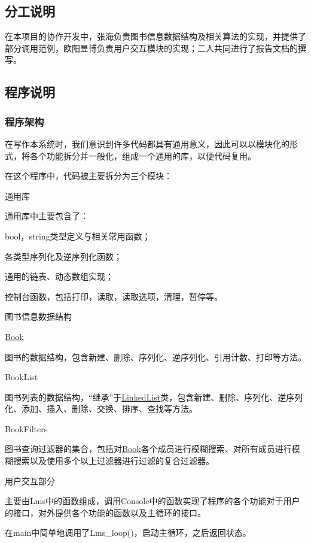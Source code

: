 \subsection*{分工说明}

在本项目的协作开发中，张海负责图书信息数据结构及相关算法的实现，并提供了部分调用范例，欧阳昱博负责用户交互模块的实现；二人共同进行了报告文档的撰写。

\subsection*{程序说明}

\subsubsection*{程序架构}

在写作本系统时，我们意识到许多代码都具有通用意义，因此可以以模块化的形式，将各个功能拆分并一般化，组成一个通用的库，以便代码复用。

在这个程序中，代码被主要拆分为三个模块：


\begin{DoxyEnumerate}
\item 通用库

通用库中主要包含了：
\begin{DoxyItemize}
\item {\ttfamily bool}，{\ttfamily string}类型定义与相关常用函数；
\item 各类型序列化及逆序列化函数；
\item 通用的链表、动态数组实现；
\item 控制台函数，包括打印，读取，读取选项，清理，暂停等。
\end{DoxyItemize}
\item 图书信息数据结构
\begin{DoxyItemize}
\item {\ttfamily \hyperlink{structBook}{Book}}

图书的数据结构，包含新建、删除、序列化、逆序列化、引用计数、打印等方法。
\item {\ttfamily Book\-List}

图书列表的数据结构，“继承”于{\ttfamily \hyperlink{structLinkedList}{Linked\-List}}类，包含新建、删除、序列化、逆序列化、添加、插入、删除、交换、排序、查找等方法。
\item {\ttfamily Book\-Filters}

图书查询过滤器的集合，包括对{\ttfamily \hyperlink{structBook}{Book}}各个成员进行模糊搜索、对所有成员进行模糊搜索以及使用多个以上过滤器进行过滤的复合过滤器。
\end{DoxyItemize}
\item 用户交互部分

主要由{\ttfamily Lms}中的函数组成，调用{\ttfamily Console}中的函数实现了程序的各个功能对于用户的接口，对外提供各个功能的函数以及主循环的接口。

在{\ttfamily main}中简单地调用了{\ttfamily Lms\-\_\-loop()}，启动主循环，之后返回状态{}。
\end{DoxyEnumerate}


